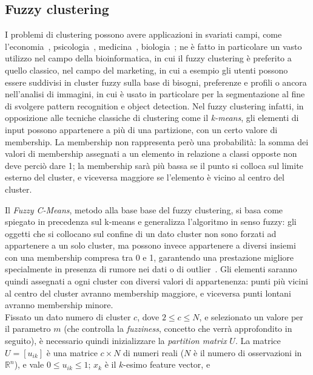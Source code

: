 \documentclass[oneside, openany]{book}
\begin{document}
	\subsection{Fuzzy clustering}
		I problemi di clustering possono avere applicazioni in svariati campi, come l'economia~\cite{bib:economy}, psicologia~\cite{bib:psychology}, medicina~\cite{bib:medicine, bib:medicine2}, biologia~\cite{bib:biology,bib:biology2}; ne è fatto in particolare un vasto utilizzo nel campo della bioinformatica, in cui il fuzzy clustering è preferito a quello classico, nel campo del marketing, in cui a esempio gli utenti possono essere suddivisi in cluster fuzzy sulla base di bisogni, preferenze e profili o ancora nell'analisi di immagini, in cui è usato in particolare per la segmentazione al fine di svolgere pattern recognition e object detection.
		Nel fuzzy clustering infatti, in opposizione alle tecniche classiche di clustering come il \textit{k-means}, gli elementi di input possono appartenere a più di una partizione, con un certo valore di membership. La membership non rappresenta però una probabilità: la somma dei valori di membership assegnati a un elemento in relazione a classi opposte non deve perciò dare 1; la membership sarà più bassa se il punto si colloca sul limite esterno del cluster, e viceversa maggiore se l'elemento è vicino al centro del cluster.
		
		Il \textit{Fuzzy C-Means}, metodo alla base base del fuzzy clustering, si basa come spiegato in precedenza sul k-means e generalizza l'algoritmo in senso fuzzy: gli oggetti che si collocano sul confine di un dato cluster non sono forzati ad appartenere a un solo cluster, ma possono invece appartenere a diversi insiemi con una membership compresa tra 0 e 1, garantendo una prestazione migliore specialmente in presenza di rumore nei dati o di outlier~\cite{bib:kmvfcm}.
		Gli elementi saranno quindi assegnati a ogni cluster con diversi valori di appartenenza: punti più vicini al centro del cluster avranno membership maggiore, e viceversa punti lontani avranno membership minore.\\
		Fissato un dato numero di cluster $c$, dove $2\leq c \le N$,  e selezionato un valore per il parametro $m$ (che controlla la \textit{fuzziness}, concetto che verrà approfondito in seguito), è necessario quindi inizializzare la \textit{partition matrix} $U$. La matrice $U=[u_{ik}]$ è una matrice $c\times N$ di numeri reali ($N$ è il numero di osservazioni in $\mathbb R^n$), e vale $0\leq u_{ik}\leq 1$; $x_k$ è il $k$-esimo feature vector, e
	
\end{document}
